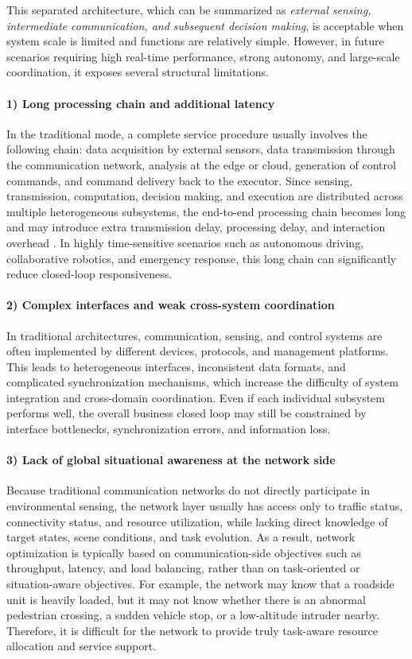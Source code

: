 This separated architecture, which can be summarized as \emph{external sensing, intermediate communication, and subsequent decision making}, is acceptable when system scale is limited and functions are relatively simple. However, in future scenarios requiring high real-time performance, strong autonomy, and large-scale coordination, it exposes several structural limitations.

\paragraph{1) Long processing chain and additional latency}
In the traditional mode, a complete service procedure usually involves the following chain: data acquisition by external sensors, data transmission through the communication network, analysis at the edge or cloud, generation of control commands, and command delivery back to the executor. Since sensing, transmission, computation, decision making, and execution are distributed across multiple heterogeneous subsystems, the end-to-end processing chain becomes long and may introduce extra transmission delay, processing delay, and interaction overhead \cite{Letaief2019Roadmap, Saad2020Vision6G}. In highly time-sensitive scenarios such as autonomous driving, collaborative robotics, and emergency response, this long chain can significantly reduce closed-loop responsiveness.

\paragraph{2) Complex interfaces and weak cross-system coordination}
In traditional architectures, communication, sensing, and control systems are often implemented by different devices, protocols, and management platforms. This leads to heterogeneous interfaces, inconsistent data formats, and complicated synchronization mechanisms, which increase the difficulty of system integration and cross-domain coordination. Even if each individual subsystem performs well, the overall business closed loop may still be constrained by interface bottlenecks, synchronization errors, and information loss.

\paragraph{3) Lack of global situational awareness at the network side}
Because traditional communication networks do not directly participate in environmental sensing, the network layer usually has access only to traffic status, connectivity status, and resource utilization, while lacking direct knowledge of target states, scene conditions, and task evolution. As a result, network optimization is typically based on communication-side objectives such as throughput, latency, and load balancing, rather than on task-oriented or situation-aware objectives. For example, the network may know that a roadside unit is heavily loaded, but it may not know whether there is an abnormal pedestrian crossing, a sudden vehicle stop, or a low-altitude intruder nearby. Therefore, it is difficult for the network to provide truly task-aware resource allocation and service support.

